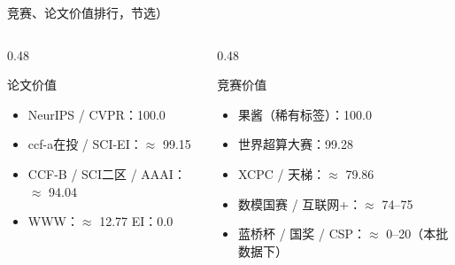 \documentclass[10pt, aspectratio=169]{beamer}
\begin{document}
\begin{frame}{竞赛、论文价值排行，节选）}
    \begin{columns}
        \begin{column}{0.48\textwidth}
            \begin{block}{论文价值}
                \scriptsize
                \begin{itemize}
                    \item NeurIPS / CVPR：100.0
                    \item ccf-a在投 / SCI-EI：$\approx$ 99.15
                    \item CCF-B / SCI二区 / AAAI：$\approx$ 94.04
                    \item WWW：$\approx$ 12.77 \quad EI：0.0
                \end{itemize}
            \end{block}
        \end{column}
        \begin{column}{0.48\textwidth}
            \begin{block}{竞赛价值}
                \scriptsize
                \begin{itemize}
                    \item 果酱（稀有标签）：100.0
                    \item 世界超算大赛：99.28
                    \item XCPC / 天梯：$\approx$ 79.86
                    \item 数模国赛 / 互联网+：$\approx$ 74--75
                    \item 蓝桥杯 / 国奖 / CSP：$\approx$ 0--20（本批数据下）
                \end{itemize}
            \end{block}
        \end{column}
    \end{columns}
    \vspace{0.2cm}
    \centering
    \footnotesize 
\end{frame}
\end{document}
